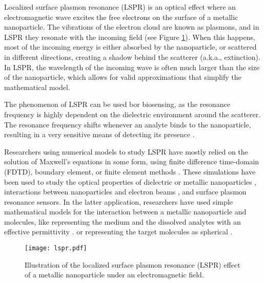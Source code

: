
Localized surface plasmon resonance (LSPR) is an optical effect where an 
electromagnetic wave excites the free electrons on the surface of a metallic nanoparticle.
The vibrations of the electron cloud are known as plasmons, and in LSPR they resonate with the incoming
field (see Figure \ref{fig:lspr}). When this happens, most of the incoming energy
is either absorbed by the nanoparticle, or scattered in different directions,
creating a shadow behind the scatterer (a.k.a., extinction). In LSPR,
the wavelength of the incoming wave is often much larger than 
the size of the nanoparticle, 
which allows for valid approximations that simplify the mathematical model.

The phenomenon of LSPR can be used bor biosensing, 
as the resonance frequency is highly dependent on the dielectric environment 
around the scatterer. 
The resonance frequency shifts whenever an analyte binds to the nanoparticle, 
resulting in a very sensitive means of detecting its presence \cite{HaesVanduyne2002,HaesETal2004}.

Researchers using numerical models to study LSPR have mostly relied on the 
solution of Maxwell's equations in some form, using finite difference time-domain (FDTD),
boundary element, or finite element methods \cite{SolisTaboadaObelleiroLiz-MaarzanGarciadeabajo2014}. 
These simulations have been used to study the 
optical properties of dielectric or metallic nanoparticles \cite{Hohenester2018,HohenesterTrugler2012,
JungPedersenSondergaardPedersenLarsenNielsen2010, VideenSun2003,
MayergoyzFredkinZhang2005, MayergoyzZhang2007}, interactions between nanoparticles
and electron beams \cite{GarciadeabajoAizpurua1997, GarciadeabajoHowie2002},
and surface plasmon resonance sensors.
In the latter application, researchers have used simple mathematical models for the 
interaction between a metallic nanoparticle and molecules,
like representing the medium and the dissolved analytes with an effective permittivity \cite{JungCampbellChinowskyMarYee1998,HaesETal2004,PhanETal2013}. 
or representing the target molecules as spherical 
\cite{DavisGomezVernon2010,AntosiewiczApellClaudioKall2011}.

\begin{figure}[h] %
   \centering
   \texttt{[image: lspr.pdf]} 
   \caption{Illustration of the localized surface plasmon resonance (LSPR) effect of a metallic nanoparticle under an electromagnetic field. }
   \label{fig:lspr}
\end{figure}

